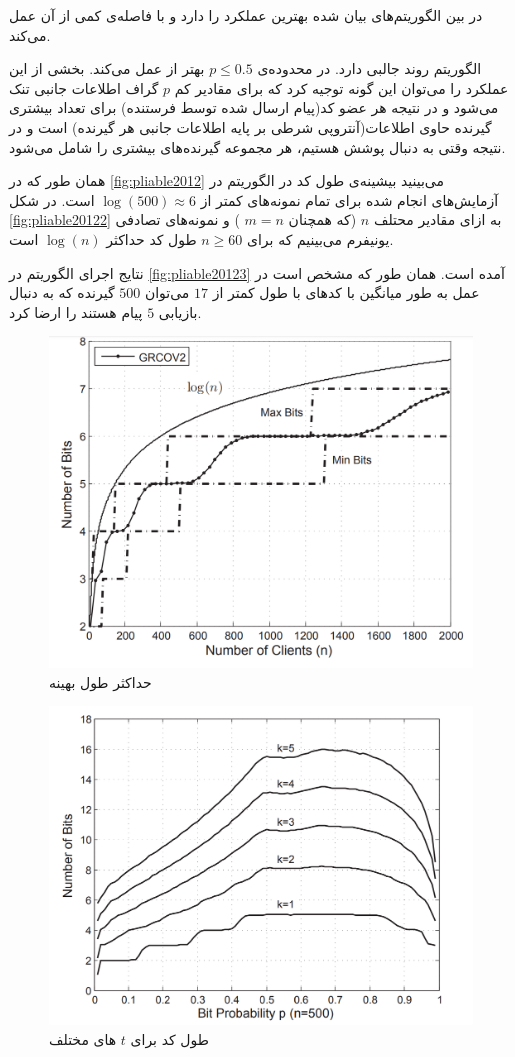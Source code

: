 در بین الگوریتم‌های بیان شده
بهترین عملکرد را دارد و
با فاصله‌ی کمی از آن عمل می‌کند.

الگوریتم
روند جالبی دارد. در محدوده‌ی
$p \leq 0.5$
بهتر از
عمل می‌کند. بخشی از این عملکرد را می‌توان این گونه توجیه کرد که برای مقادیر کم
$p$
گراف اطلاعات جانبی تنک می‌شود و در نتیجه هر عضو کد(پیام ارسال شده توسط فرستنده)  برای تعداد بیشتری گیرنده حاوی اطلاعات(آنتروپی شرطی بر پایه اطلاعات جانبی هر گیرنده) است و در نتیجه وقتی به دنبال پوشش هستیم، هر مجموعه گیرنده‌های بیشتری را شامل می‌شود.

همان طور که در
\autoref{fig:pliable2012}
می‌بینید بیشینه‌ی طول کد در الگوریتم
در آزمایش‌های انجام شده برای تمام نمونه‌های
\picod
کمتر از
$\log(500) \approx 6$
است. در شکل
\autoref{fig:pliable20122}
به ازای مقادیر محتلف
$n$
(که همچنان
$m = n$
) و نمونه‌های تصادفی یونیفرم می‌بینیم که برای
$n \geq 60$
طول کد حداکثر
$\log(n)$
است.

نتایج اجرای الگوریتم
در
\autoref{fig:pliable20123}
آمده است. همان طور که مشخص است در عمل به طور میانگین با کدهای با طول کمتر از
$17$
می‌توان
$500$
گیرنده که به دنبال بازیابی
$5$
پیام هستند را ارضا کرد.
\begin{figure}
    \centering
    \includegraphics[width=0.7\linewidth]{figs/ch3/pliable2012_2}
    \caption[حداکثر طول بهینه
    ]{
        حداکثر طول بهینه
        \cite{pliablefirstpaper}}
    \label{fig:pliable20122}
\end{figure}
\begin{figure}
    \centering
    \includegraphics[width=0.7\linewidth]{figs/ch3/pliable2012_3}
    \caption[
        طول کد برای
        $t$
        های مختلف
    ]{
        طول کد برای
        $t$
        های مختلف
        \cite{pliablefirstpaper}}
    \label{fig:pliable20123}
\end{figure}

